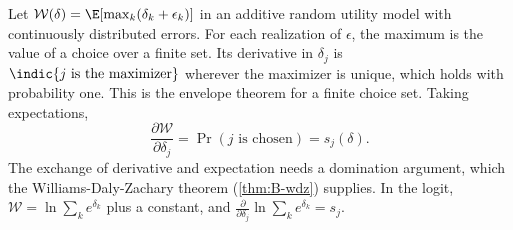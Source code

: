 \begin{example}\label{ex:B-logsum-envelope}
Let $\mathcal{W}(\delta) = \E[\max_k(\delta_k + \epsilon_k)]$ in an additive random utility model with continuously distributed
errors. For each realization of $\epsilon$, the maximum is the value of a choice over a finite set. Its derivative in
$\delta_j$ is $\indic\{j \text{ is the maximizer}\}$ wherever the maximizer is unique, which holds with probability one.
This is the envelope theorem for a finite choice set. Taking expectations,
\begin{equation*}
\frac{\partial \mathcal{W}}{\partial \delta_j} = \Pr(j \text{ is chosen}) = s_j(\delta) .
\end{equation*}
The exchange of derivative and expectation needs a domination argument, which the Williams-Daly-Zachary theorem
(\cref{thm:B-wdz}) supplies. In the logit, $\mathcal{W} = \ln\sum_ke^{\delta_k}$ plus a constant, and
$\frac{\partial}{\partial \delta_j}\ln\sum_ke^{\delta_k} = s_j$.
\end{example}
